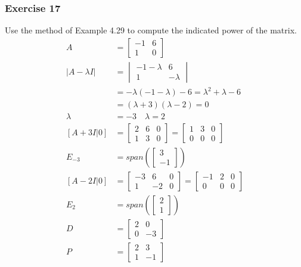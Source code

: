 \documentclass{math}
\begin{document}
\subsubsection*{Exercise 17}
Use the method of Example 4.29 to compute the indicated power of the matrix.
\begin{align*}
  A &= \begin{bmatrix}-1 & 6 \\ 1 & 0\end{bmatrix} \\
  |A-\lambda I| &= \begin{vmatrix}
    -1-\lambda & 6 \\
    1 & -\lambda
  \end{vmatrix} \\
  &= -\lambda(-1-\lambda)-6 = \lambda^2+\lambda-6 \\
  &= (\lambda+3)(\lambda-2) = 0 \\
  \lambda &= -3 \quad \lambda = 2 \\
  [A+3I|0] &= \begin{bmatrix}
    2 & 6 & 0 \\
    1 & 3 & 0
  \end{bmatrix} = \begin{bmatrix}
    1 & 3 & 0 \\
    0 & 0 & 0
  \end{bmatrix} \\
  E_{-3} &= span\left(\begin{bmatrix}3 \\ -1\end{bmatrix}\right) \\
  [A-2I|0] &= \begin{bmatrix}
    -3 & 6 & 0 \\
    1 & -2 & 0
  \end{bmatrix} = \begin{bmatrix}
    -1 & 2 & 0 \\
    0 & 0 & 0
  \end{bmatrix} \\
  E_2 &= span\left(\begin{bmatrix}2 \\ 1\end{bmatrix}\right) \\
  D &= \begin{bmatrix}2 & 0 \\ 0 & -3\end{bmatrix} \\
  P &= \begin{bmatrix}2 & 3 \\ 1 & -1\end{bmatrix} \\

\end{align*}
\end{document}
